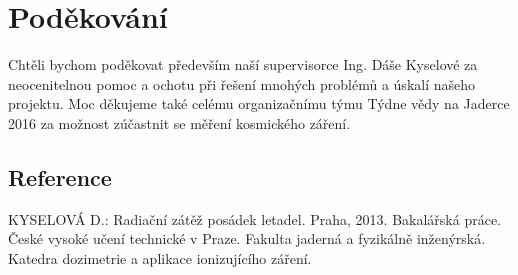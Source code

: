 \documentclass[12pt,a4paper]{article}
\begin{document}
\section*{Poděkování}
Chtěli bychom poděkovat především naší supervisorce Ing. Dáše Kyselové za neocenitelnou pomoc a ochotu při
řešení mnohých problémů a úskalí našeho projektu. Moc děkujeme také celému organizačnímu týmu Týdne vědy na
Jaderce 2016 za možnost zúčastnit se měření kosmického záření.
\subsection*{Reference}
\begin{thebibliography}{99}
KYSELOVÁ D.: Radiační zátěž posádek letadel. Praha, 2013. Bakalářská práce. České vysoké
učení technické v Praze. Fakulta jaderná a fyzikálně inženýrská. Katedra dozimetrie a aplikace ionizujícího
záření.
\end{thebibliography}
\end{document}
